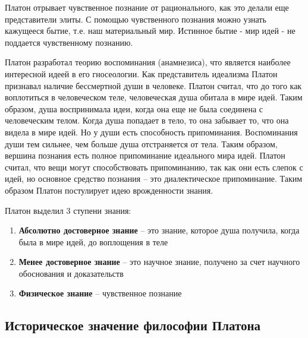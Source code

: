 \documentclass[
]{article}
\providecommand{\tightlist}{%
  \setlength{\itemsep}{0pt}\setlength{\parskip}{0pt}}
\begin{document}
Платон отрывает чувственное познание от рационального, как это делали
еще представители элиты. С помощью чувственного познания можно узнать
кажущееся бытие, т.е. наш материальный мир. Истинное бытие - мир идей -
не поддается чувственному познанию.

Платон разработал теорию воспоминания (анамнезиса), что является
наиболее интересной идеей в его гносеологии. Как представитель идеализма
Платон признавал наличие бессмертной души в человеке. Платон считал, что
до того как воплотиться в человеческом теле, человеческая душа обитала в
мире идей. Таким образом, душа воспринимала идеи, когда она еще не была
соединена с человеческим телом. Когда душа попадает в тело, то она
забывает то, что она видела в мире идей. Но у души есть способность
припоминания. Воспоминания души тем сильнее, чем больше душа
отстраняется от тела. Таким образом, вершина познания есть полное
припоминание идеального мира идей. Платон считал, что вещи могут
способствовать припоминанию, так как они есть слепок с идей, но основное
средство познания -- это диалектическое припоминание. Таким образом
Платон постулирует идею врожденности знания.

Платон выделил 3 ступени знания:

\begin{enumerate}
\def\labelenumi{\arabic{enumi}.}
\tightlist
\item
  \textbf{Абсолютно достоверное знание} -- это знание, которое душа
  получила, когда была в мире идей, до воплощения в теле
\item
  \textbf{Менее достоверное знание} -- это научное знание, получено за
  счет научного обоснования и доказательств
\item
  \textbf{Физическое знание} -- чувственное познание
\end{enumerate}

\hypertarget{ux438ux441ux442ux43eux440ux438ux447ux435ux441ux43aux43eux435-ux437ux43dux430ux447ux435ux43dux438ux435-ux444ux438ux43bux43eux441ux43eux444ux438ux438-ux43fux43bux430ux442ux43eux43dux430}{%
\subsection{Историческое значение философии
Платона}\label{ux438ux441ux442ux43eux440ux438ux447ux435ux441ux43aux43eux435-ux437ux43dux430ux447ux435ux43dux438ux435-ux444ux438ux43bux43eux441ux43eux444ux438ux438-ux43fux43bux430ux442ux43eux43dux430}}
\end{document}
